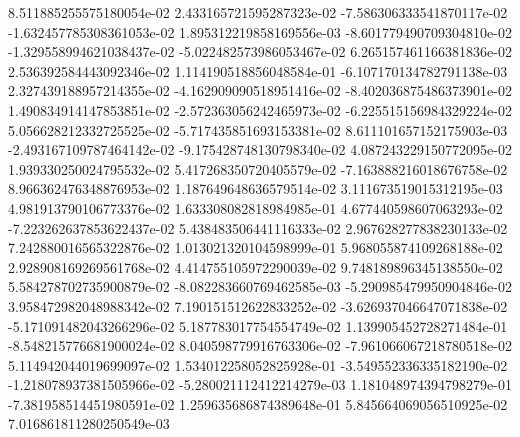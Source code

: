 8.511885255575180054e-02
2.433165721595287323e-02
-7.586306333541870117e-02
-1.632457785308361053e-02
1.895312219858169556e-03
-8.601779490709304810e-02
-1.329558994621038437e-02
-5.022482573986053467e-02
6.265157461166381836e-02
2.536392584443092346e-02
1.114190518856048584e-01
-6.107170134782791138e-03
2.327439188957214355e-02
-4.162909090518951416e-02
-8.402036875486373901e-02
1.490834914147853851e-02
-2.572363056242465973e-02
-6.225515156984329224e-02
5.056628212332725525e-02
-5.717435851693153381e-02
8.611101657152175903e-03
-2.493167109787464142e-02
-9.175428748130798340e-02
4.087243229150772095e-02
1.939330250024795532e-02
5.417268350720405579e-02
-7.163888216018676758e-02
8.966362476348876953e-02
1.187649648636579514e-02
3.111673519015312195e-03
4.981913790106773376e-02
1.633308082818984985e-01
4.677440598607063293e-02
-7.223262637853622437e-02
5.438483506441116333e-02
2.967628277838230133e-02
7.242880016565322876e-02
1.013021320104598999e-01
5.968055874109268188e-02
2.928908169269561768e-02
4.414755105972290039e-02
9.748189896345138550e-02
5.584278702735900879e-02
-8.082283660769462585e-03
-5.290985479950904846e-02
3.958472982048988342e-02
7.190151512622833252e-02
-3.626937046647071838e-02
-5.171091482043266296e-02
5.187783017754554749e-02
1.139905452728271484e-01
-8.548215776681900024e-02
8.040598779916763306e-02
-7.961066067218780518e-02
5.114942044019699097e-02
1.534012258052825928e-01
-3.549552336335182190e-02
-1.218078937381505966e-02
-5.280021112412214279e-03
1.181048974394798279e-01
-7.381958514451980591e-02
1.259635686874389648e-01
5.845664069056510925e-02
7.016861811280250549e-03
